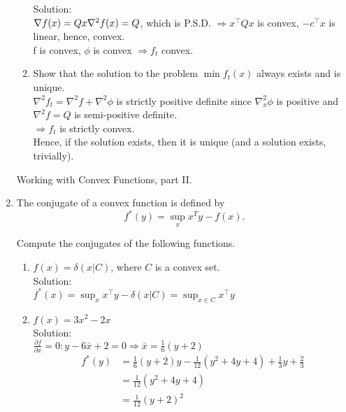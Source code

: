 \documentclass[12pt]{amsart}
\newcommand{\grad}{\nabla}
\begin{document}
\begin{enumerate}
\begin{enumerate}
\noindent
Solution:\\
$\grad f(x) = Qx \\
\grad^2 f(x) = Q$, which is P.S.D. $\Rightarrow x^\top Qx$ is convex, $-c^\top x$ is linear, hence, convex. \\
f is convex, $\phi$ is convex $\Rightarrow f_t$ convex. \\

\item
Show that the solution to the problem $\min f_t(x)$ always
exists and is unique. \\

$\grad^2 f_t = \grad^2 f + \grad^2 \phi$ is strictly positive definite since $\grad_x^2 \phi$ is positive and $\grad^2 f = Q$ is semi-positive definite.\\
$\Rightarrow f_t$ is strictly convex.  \\
Hence, if the solution exists, then it is unique (and a solution exists, trivially). \\ 

\end{enumerate}



\newpage

\noindent
{\sf Working with Convex Functions, part II.}

\item The conjugate of a convex function is defined by 
\[
f^*(y) = \sup_x x^Ty - f(x).
\]

Compute the conjugates of the following functions. 
\begin{enumerate}

\item $f(x) = \delta(x|C)$, where $C$ is a convex set.  \\

\noindent
Solution:\\
$f^*(x) = \displaystyle \sup_x x^\top y - \delta(x|C) = \sup_{x \in C} x^\top y$ \\

\item $f(x) = 3x^2 - 2x$ \\

\noindent
Solution:\\
$\frac{\partial f}{\partial x} = 0: y - 6\bar{x} + 2 = 0 \Rightarrow \bar{x} = \frac{1}{6} (y+2)$
\begin{align*}
f^*(y) &= \frac{1}{6}(y+2)y - \frac{1}{12}(y^2 + 4y + 4) + \frac{1}{3}y + \frac{2}{3}\\
         &= \frac{1}{12}(y^2 + 4y + 4) \\
	 &= \frac{1}{12} (y+2)^2
\end{align*}


\end{enumerate}
\end{enumerate}
\end{document}
